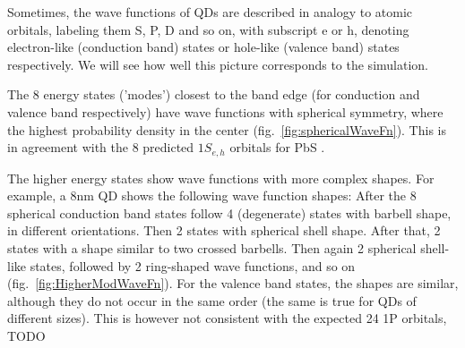 %
Sometimes, the wave functions of QDs are described in analogy to atomic orbitals, labeling them S, P, D and so on, with subscript e or h, denoting electron-like (conduction band) states or hole-like (valence band) states respectively. We will see how well this picture corresponds to the simulation.

The 8 energy states ('modes') closest to the band edge (for conduction and valence band respectively) have wave functions with spherical symmetry, where the highest probability density in the center (fig.~\ref{fig:sphericalWaveFn}). This is in agreement with the 8 predicted $1S_{e,h}$ orbitals for PbS \cite{ChemRev}.
	
The higher energy states show wave functions with more complex shapes. For example, a 8nm QD shows the following wave function shapes: After the 8 spherical conduction band states follow 4 (degenerate) states with barbell shape, in different orientations. Then 2 states with spherical shell shape. After that, 2 states with a shape similar to two crossed barbells. Then again 2 spherical shell-like states, followed by 2 ring-shaped wave functions, and so on (fig.~\ref{fig:HigherModWaveFn}). For the valence band states, the shapes are similar, although they do not occur in the same order (the same is true for QDs of different sizes).
This is however not consistent with the expected 24 1P orbitals, TODO
